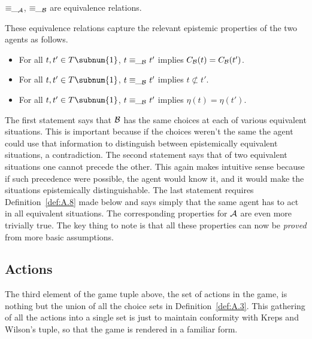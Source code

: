\begin{proposition} \label{prop:A.2}\hspace{.1pc} $\equiv\!\!\__{\cal A}$, $\equiv\!\!\__{\cal
B}$ are equivalence relations. \end{proposition}


\noindent These equivalence relations capture the 
relevant epistemic properties of the two agents as follows.

\begin{proposition}\label{prop:A.3} \hspace{.1pc}
\begin{itemize} \item {For all $t,t' \in 
T\subnum{1}$, $t \equiv\!\!\__{\cal B}\,\, t'$ implies 
$C_{\cal B}(t) = C_{\cal B}(t')$.}

\item {For all $t,t' \in T\subnum{1}$, $t \equiv\!\!\__{\cal B}\,\, t'$ 
implies $t \not\subset t'$.}

\item {For all $t,t' \in T\subnum{1}$, $t \equiv\!\!\__{\cal
B}\,\, t'$ implies $\eta(t) = \eta(t')$.} 
\end{itemize}
\end{proposition}

\noindent The first statement says that $\cal B$ has the same choices at each of various equivalent situations. This is important because if the choices weren't the same the agent could use that information to distinguish between epistemically equivalent situations, a contradiction. The second statement says that of two equivalent situations one cannot precede the other. This again makes intuitive sense because if such precedence were possible, the agent would know it, and it would make the situations epistemically distinguishable. The last statement requires Definition~\ref{def:A.8} made below and says simply that the same agent has to act in all equivalent situations. The corresponding properties for ${\cal A}$ are even more trivially true. The key thing to note is that all these properties can now be \emph{proved} from more basic assumptions.


\subsection{Actions}\label{sec:A.4.2}

The third element of the game tuple above, the 
set of actions in the game, is nothing but the union of all the choice sets 
in Definition~\ref{def:A.3}. This gathering of all the actions into a single set is just to maintain conformity with Kreps and Wilson's tuple, so that the game is rendered in a familiar form.

